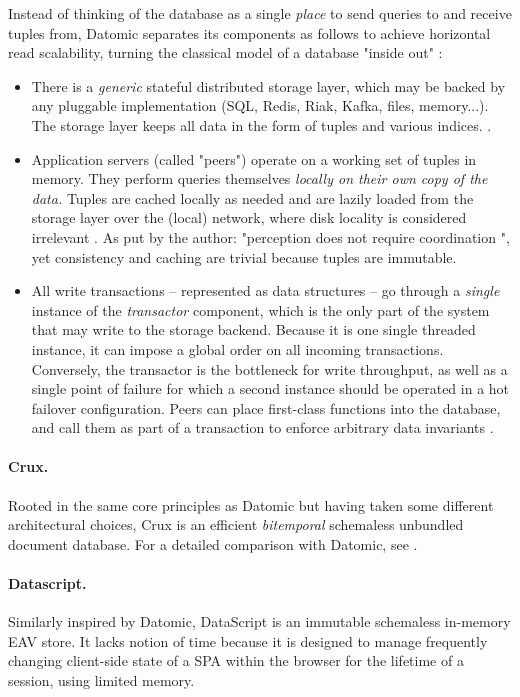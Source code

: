 Instead of thinking of the database as a single \emph{place} to send queries to and receive tuples from, Datomic separates its components as follows to achieve horizontal read scalability, turning the classical model of a database "inside out" \cite{kleppmann2017designing}:
\begin{itemize}
  \item There is a \emph{generic} stateful distributed storage layer, which may be backed by any pluggable implementation (SQL, Redis, Riak, Kafka, files, memory...). The storage layer keeps all data in the form of tuples and various indices. \cite{hickey2019datomic}.
  \item Application servers (called "peers") operate on a working set of tuples in memory. They perform queries themselves \emph{locally on their own copy of the data.} Tuples are cached locally as needed and are lazily loaded from the storage layer over the (local) network, where disk locality is considered irrelevant \cite{ananthanarayanan2011disk}. As put by the author: "perception does not require coordination \cite{hickey2012values}", yet consistency and caching are trivial because tuples are immutable.
  \item All write transactions -- represented as data structures -- go through a \emph{single} instance of the \emph{transactor} component, which is the only part of the system that may write to the storage backend. Because it is one single threaded instance, it can impose a global order on all incoming transactions. Conversely, the transactor is the bottleneck for write throughput, as well as a single point of failure for which a second instance should be operated in a hot failover configuration. Peers can place first-class functions into the database, and call them as part of a transaction to enforce arbitrary data invariants \cite{datomicdocs}.
\end{itemize}


\paragraph{Crux.} Rooted in the same core principles as Datomic but having taken some different architectural choices, Crux is an efficient \emph{bitemporal} schemaless unbundled document database. For a detailed comparison with Datomic, see \cite{juxtcrux}.

\paragraph{Datascript.} Similarly inspired by Datomic, DataScript \cite{prokopov15datascript} is an immutable schemaless in-memory EAV store. It lacks notion of time because it is designed to manage frequently changing client-side state of a \gls{SPA} within the browser for the lifetime of a session, using limited memory.

